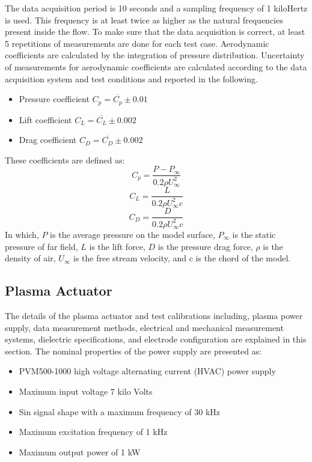 \documentclass[fleqn,10pt]{SelfArx} %
\begin{document}
The data acquisition period is 10 seconds and a sampling frequency of 1 kiloHertz is used. This frequency is at least twice as higher as the natural frequencies present inside the flow. To make sure that the data acquisition is correct, at least 5 repetitions of measurements are done for each test case. Aerodynamic coefficients are calculated by the integration of pressure distribution. Uncertainty of measurements for aerodynamic coefficients are calculated according to the data acquisition system and test conditions and reported in the following.
\begin{itemize}
\item Pressure coefficient $C_p=\overline{C_p} \pm 0.01$
\item Lift coefficient $C_L=\overline{C_L} \pm 0.002$
\item Drag coefficient $C_D=\overline{C_D} \pm 0.002$
\end{itemize}
These coefficients are defined as:
\begin{equation}
C_p=\dfrac{P-P_{\infty}}{0.2\rho U_{\infty}^2}
\end{equation}
\begin{equation}
C_L=\dfrac{L}{0.2\rho U_{\infty}^2 c}
\end{equation}
\begin{equation}
C_D=\dfrac{D}{0.2\rho U_{\infty}^2 c}
\end{equation}
In which, $P$ is the average pressure on the model surface, $P_{\infty}$ is the static pressure of far field, $L$ is the lift force, $D$ is the pressure drag force, $\rho$ is the density of air, $U_{\infty}$ is the free stream velocity, and c is the chord of the model.

\subsection{Plasma Actuator}
The details of the plasma actuator and test calibrations including, plasma power supply, data measurement methods, electrical and mechanical measurement systems, dielectric specifications, and electrode configuration are explained in this section. The nominal properties of the power supply are presented as:
\begin{itemize}
\item PVM500-1000 high voltage  alternating current (HVAC) power supply
\item Maximum input voltage 7 kilo Volts
\item Sin signal shape with a maximum frequency of 30 kHz
\item Maximum excitation frequency of 1 kHz
\item Maximum output power of 1 kW
\end{itemize}
\end{document}
